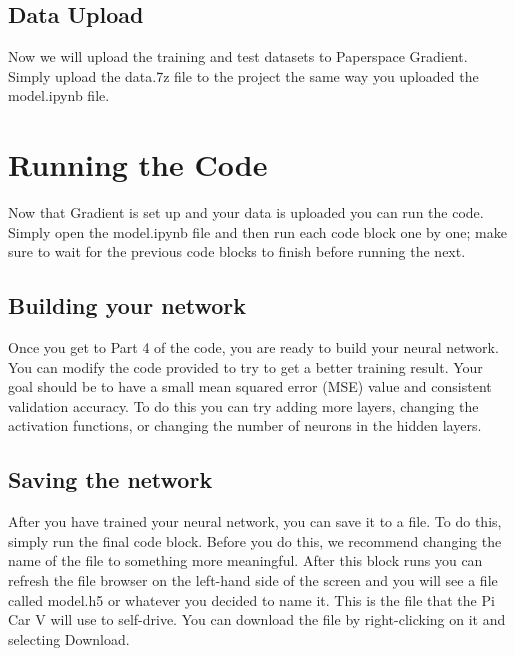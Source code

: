 \documentclass[11pt]{report}
\begin{document}
\section{Data Upload}
Now we will upload the training and test datasets to Paperspace Gradient. Simply upload the data.7z file to the project the same way you uploaded the model.ipynb file.

\chapter{Running the Code}
Now that Gradient is set up and your data is uploaded you can run the code. Simply open the model.ipynb file and then run each code block one by one; make sure to wait for the previous code blocks to finish before running the next.

\section{Building your network}
Once you get to Part 4 of the code, you are ready to build your neural network. You can modify the code provided to try to get a better training result. Your goal should be to have a small mean squared error (MSE) value and consistent validation accuracy. To do this you can try adding more layers, changing the activation functions, or changing the number of neurons in the hidden layers.

\section{Saving the network}
After you have trained your neural network, you can save it to a file. To do this, simply run the final code block. Before you do this, we recommend changing the name of the file to something more meaningful. After this block runs you can refresh the file browser on the left-hand side of the screen and you will see a file called model.h5 or whatever you decided to name it. This is the file that the Pi Car V will use to self-drive. You can download the file by right-clicking on it and selecting Download. 

\pagebreak
\end{document}
